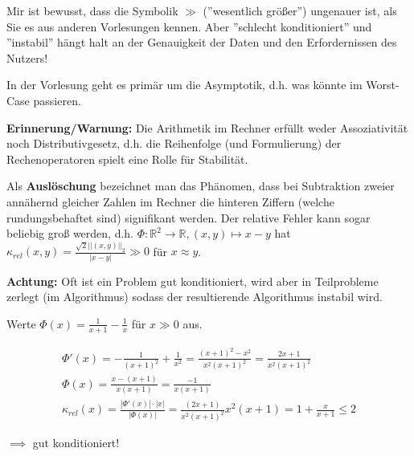 \begin{remark}
	Mir ist bewusst, dass die Symbolik $\gg$ (''wesentlich größer'') ungenauer ist, als Sie es aus anderen Vorlesungen kennen. Aber ''schlecht konditioniert'' und ''instabil'' hängt halt an der Genauigkeit der Daten und den Erfordernissen des Nutzers!
\end{remark}

In der Vorlesung geht es primär um die Asymptotik, d.h. was könnte im Worst-Case passieren.

\textbf{Erinnerung/Warnung:} Die Arithmetik im Rechner erfüllt weder Assoziativität noch Distributivgesetz, d.h. die Reihenfolge (und Formulierung) der Rechenoperatoren spielt eine Rolle für Stabilität.

\begin{example}
	Als \textbf{Auslöschung} bezeichnet man das Phänomen, dass bei Subtraktion zweier annähernd gleicher Zahlen im Rechner die hinteren Ziffern (welche rundungsbehaftet sind) signifikant werden. Der relative Fehler kann sogar beliebig groß werden, d.h. $\Phi: \mathbb{R}^2 \rightarrow \mathbb{R}, (x,y) \mapsto x-y$ hat $\kappa_{rel}(x,y) = \frac{\sqrt{2} ||(x,y)||_2}{|x-y|} \gg 0$ für $x\approx y$.
\end{example}

\textbf{Achtung:} Oft ist ein Problem gut konditioniert, wird aber in Teilprobleme zerlegt (im Algorithmus) sodass der resultierende Algorithmus instabil wird.

\begin{example}
	Werte $\Phi(x) = \frac{1}{x+1} - \frac{1}{x}$ für $x \gg 0$ aus.
	
	\begin{align*}
		\Phi'(x) = - \frac{1}{(x+1)^2} + \frac{1}{x^2} = \frac{(x+1)^2 - x^2}{x^2(x+1)^2} = \frac{2x+1}{x^2(x+1)^2}\\
		\Phi(x) = \frac{x-(x+1)}{x(x+1)} = \frac{-1}{x(x+1)}\\
		\kappa_{rel}(x) = \frac{|\Phi'(x)| \cdot |x|}{|\Phi(x)|} = \frac{(2x+1)}{x^2(x+1)^2} x^2 (x+1) = 1 + \frac{x}{x+1} \leq 2
	\end{align*}
	
	$\implies$ gut konditioniert!	
\end{example}

